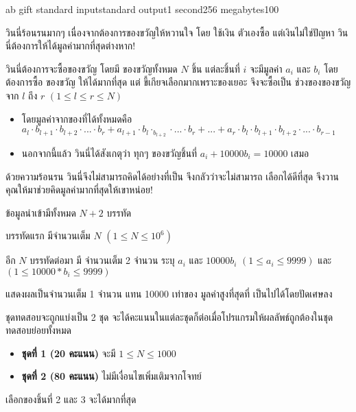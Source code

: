\documentclass[11pt,a4paper]{article}
\begin{document}
\begin{problem}{ab gift }{standard input}{standard output}{1 second}{256 megabytes}{100}

วินนี่ร้อนรนมากๆ เนื่องจากต้องการของขวัญให้หวานใจ โดย ใช้เงิน ตัวเองซื้อ แต่เงินไม่ใช่ปัญหา วินนี่ต้องการให้ได้มูลค่ามากที่สุดต่างหาก!

วินนี่ต้องการจะซื้อของขวัญ โดยมี ของขวัญทั้งหมด $N$ ชิ้น แต่ละชิ้นที่ $i$ จะมีมูลค่า $a_i$ และ  $b_i$
โดยต้องการซื้อ ของขวัญ ให้ได้มากที่สุด แต่ ขี้เกียจเลือกมากเพราะของเยอะ จึงจะซื้อเป็น ช่วงของของขวัญจาก $l$ ถึง $r$ $( 1 \leq l \leq r \leq N )$ 
\begin{itemize}

\item โดยมูลค่าจากของที่ได้ทั้งหมดคือ  $a_l \cdot b_{l+1} \cdot b_{l+2} \cdot ... \cdot b_r +
a_{l+1} \cdot b_l \cdot _b_{l+2} \cdot ... \cdot b_r +...+ a_r \cdot b_l \cdot b_{l+1} \cdot b_{l+2} \cdot ... \cdot b_{r-1}$ 
\item นอกจากนี้แล้ว วินนี่ได้สังเกตุว่า ทุกๆ ของขวัญชิ้นที่ $a_i+10000b_i = 10000$ เสมอ
\end{itemize}

ด้วยความร้อนรน วินนี่จึงไม่สามารถคิดได้อย่างที่เป็น จึงกลัวว่าจะไม่สามารถ เลือกได้ดีที่สุด จึงวานคุณให้มาช่วยคิดมูลค่ามากที่สุดให้เขาหน่อย! 

\InputFile
ข้อมูลนำเข้ามีทั้งหมด $N+2$ บรรทัด

บรรทัดแรก มีจำนวนเต็ม $N$ $( 1 \leq N \leq 10^6 )$ 

อีก $N$ บรรทัดต่อมา มี จำนวนเต็ม 2 จำนวน ระบุ $a_i$ และ $10000b_i$
$( 1 \leq a_i \leq 9999 )$ และ $( 1 \leq 10000 * b_i \leq 9999 ) $

\OutputFile
แสดงผลเป็นจำนวนเต็ม 1 จำนวน แทน 10000 เท่าของ มูลค่าสูงที่สุดที่ เป็นไปได้โดยปัดเศษลง

\Scoring
ชุดทดสอบจะถูกแบ่งเป็น 2 ชุด จะได้คะแนนในแต่ละชุดก็ต่อเมื่อโปรแกรมให้ผลลัพธ์ถูกต้องในชุดทดสอบย่อยทั้งหมด

\begin{itemize}

\item \textbf{ชุดที่ 1  (20 คะแนน)} จะมี $1 \leq N \leq 1000$

\item \textbf{ชุดที่ 2 (80 คะแนน)} ไม่มีเงื่อนไขเพิ่มเติมจากโจทย์

\end{itemize}

\Example

\begin{example}
%
\end{example}

\Note

เลือกของชิ้นที่ 2 และ 3 จะได้มากที่สุด

\end{problem}
\end{document}

